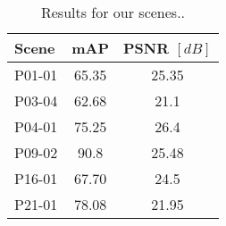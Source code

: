\begin{table}
\centering
\begin{tabular}{lcc}
    \hline Scene & mAP & PSNR $[dB]$  \\
    \hline 
    P01-01  & 65.35 & 25.35  \\
    P03-04  & 62.68 & 21.1  \\
    P04-01 & 75.25 & 26.4  \\
    P09-02  & 90.8 & 25.48  \\
    P16-01  & 67.70 & 24.5  \\
    P21-01  & 78.08 & 21.95  \\
    \hline
    \end{tabular}
    \caption{Results for our scenes..}
\end{table}